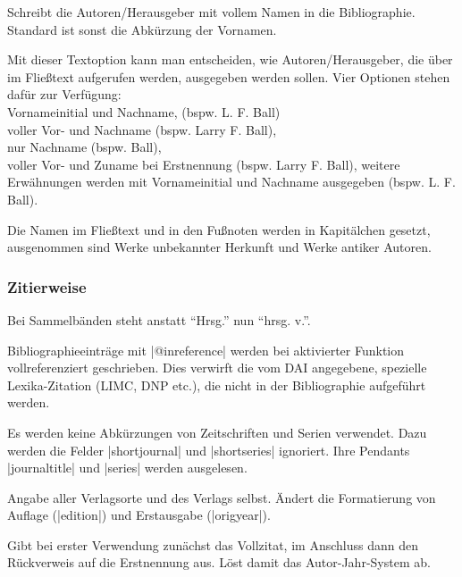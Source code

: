 \documentclass[a4paper,10pt,ngerman]{ltxdoc}
\begin{document}
  Schreibt die Autoren/Herausgeber mit vollem Namen in die Bibliographie. Standard ist sonst die Abkürzung der Vornamen. 

Mit dieser Textoption kann man entscheiden, 
wie Autoren/Herausgeber, die über \- im Fließtext aufgerufen werden,
ausgegeben werden sollen.
Vier Optionen stehen dafür zur Verfügung:\\
Vornameinitial und Nachname, (bspw. L. F. Ball)\\
voller Vor- und Nachname (bspw. Larry F. Ball),\\
nur Nachname (bspw. Ball), \\
voller Vor- und Zuname bei Erstnennung (bspw. Larry F. Ball), 
weitere Erwähnungen werden mit Vornameinitial und Nachname ausgegeben (bspw. L. F. Ball).

  Die Namen im Fließtext und in den Fußnoten werden in Kapitälchen gesetzt, ausgenommen sind Werke unbekannter Herkunft und Werke antiker Autoren.

\subsubsection{Zitierweise}

  Bei Sammelbänden steht anstatt \enquote{Hrsg.} nun \enquote{hrsg. v.}.

  Bibliographieeinträge mit |@inreference| werden bei aktivierter Funktion vollreferenziert geschrieben. 
Dies verwirft die vom DAI angegebene, spezielle Lexika-Zitation (LIMC, DNP etc.), die  nicht in der Bibliographie aufgeführt werden. 

  Es werden keine Abkürzungen von Zeitschriften und Serien verwendet. Dazu werden die Felder |shortjournal| und |shortseries| ignoriert. Ihre Pendants |journaltitle| und |series| werden ausgelesen.

  Angabe aller Verlagsorte und des Verlags selbst. Ändert die Formatierung von Auflage (|edition|) und Erstausgabe (|origyear|).

  Gibt bei erster Verwendung zunächst das Vollzitat, im Anschluss dann den Rückverweis auf die Erstnennung aus. Löst damit das Autor-Jahr-System ab. 
\end{document}

